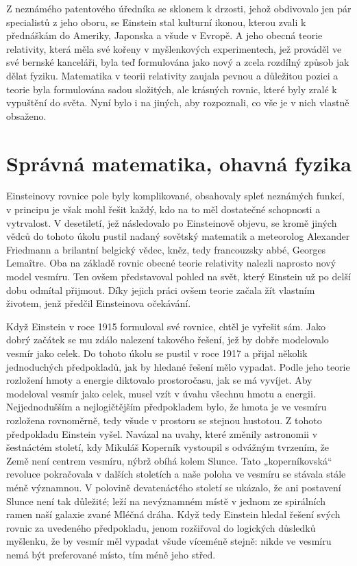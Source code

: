   Z neznámého patentového úředníka se sklonem k drzosti, jehož obdivovalo jen pár specialistů z jeho
  oboru, se Einstein stal kulturní ikonou, kterou zvali k přednáškám do Ameriky, Japonska a všude v
  Evropě. A jeho obecná teorie relativity, která měla své kořeny v myšlenkových experimentech, jež
  prováděl ve své bernské kanceláři, byla teď formulována jako nový a zcela rozdílný způsob jak
  dělat fyziku. Matematika v teorii relativity zaujala pevnou a důležitou pozici a teorie byla
  formulována sadou složitých, ale krásných rovnic, které byly zralé k vypuštění do světa. Nyní bylo
  i na jiných, aby rozpoznali, co vše je v nich vlastně obsaženo.

\section{Správná matematika, ohavná fyzika}\label{feyIchIIIsecIV} 
  Einsteinovy rovnice pole byly komplikované, obsahovaly spleť neznámých funkcí, v principu je však
  mohl řešit každý, kdo na to měl dostatečné schopnosti a vytrvalost. V desetiletí, jež následovalo
  po Einsteinově objevu, se kromě jiných vědců do tohoto úkolu pustil nadaný sovětský matematik a
  meteorolog Alexander Friedmann a brilantní belgický vědec, kněz, tedy francouzsky abbé, Georges
  Lemaître. Oba na základě rovnic obecné teorie relativity nalezli naprosto nový model vesmíru. Ten
  ovšem představoval pohled na svět, který Einstein už po delší dobu odmítal přijmout. Díky jejich
  práci ovšem teorie začala žít vlastním životem, jenž předčil Einsteinova očekávání. 
  
  Když Einstein v roce 1915 formuloval své rovnice, chtěl je vyřešit sám. Jako dobrý začátek se mu
  zdálo nalezení takového řešení, jež by dobře modelovalo vesmír jako celek. Do tohoto úkolu se
  pustil v roce 1917 a přijal několik jednoduchých předpokladů, jak by hledané řešení mělo vypadat.
  Podle jeho teorie rozložení hmoty a energie diktovalo prostoročasu, jak se má vyvíjet. Aby
  modeloval vesmír jako celek, musel vzít v úvahu všechnu hmotu a energii. Nejjednodušším a
  nejlogičtějším předpokladem bylo, že hmota je ve vesmíru rozložena rovnoměrně, tedy všude v
  prostoru se stejnou hustotou. Z tohoto předpokladu Einstein vyšel. Navázal na uvahy, které změnily
  astronomii v šestnáctém století, kdy Mikuláš Koperník vystoupil s odvážným tvrzením, že Země není
  centrem vesmíru, nýbrž obíhá kolem Slunce. Tato „koperníkovská“ revoluce pokračovala v dalších
  stoletích a naše poloha ve vesmíru se stávala stále méně významnou. V polovině devatenáctého
  století se ukázalo, že ani postavení Slunce není tak důležité; leží na nevýznamném místě v jednom
  ze spirálních ramen naší galaxie zvané Mléčná dráha. Když tedy Einstein hledal řešení svých rovnic
  za uvedeného předpokladu, jenom rozšiřoval do logických důsledků myšlenku, že by vesmír měl
  vypadat všude víceméně stejně: nikde ve vesmíru nemá být preferované místo, tím méně jeho střed.
    
